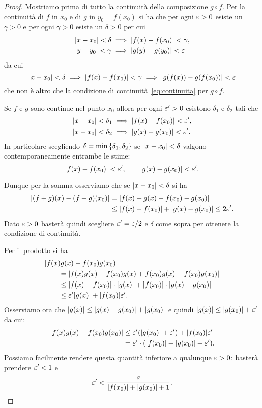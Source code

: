  \begin{proof}
  Mostriamo prima di tutto la continuità
  della composizione $g\circ f$.
  Per la continuità di $f$ in $x_0$ e di $g$ in $y_0=f(x_0)$
  si ha che per ogni $\varepsilon>0$ esiste un $\gamma>0$
  e per ogni $\gamma>0$ esiste un $\delta>0$ per cui
  \begin{align*}
   {\left|x-x_0\right|}< \delta &\implies {\left|f(x)-f(x_0)\right|}<\gamma,\\
   {\left|y-y_0\right|}< \gamma & \implies {\left|g(y)-g(y_0)\right|}<\varepsilon
  \end{align*}
  da cui
  \[
  {\left|x-x_0\right|}< \delta
  \implies {\left|f(x)-f(x_0)\right|}< \gamma
  \implies {\left|g(f(x))-g(f(x_0))\right|} < \varepsilon
  \]
  che non è altro che la condizione di
  continuità~\eqref{eq:continuita} per $g\circ f$.
  
  Se $f$ e $g$ sono continue nel punto $x_0$
  allora per ogni $\varepsilon'>0$ esistono $\delta_1$
  e $\delta_2$ tali che
  \begin{align*}
   {\left|x-x_0\right|} < \delta_1 &\implies {\left|f(x)-f(x_0)\right|} < \varepsilon',
   \\
   {\left|x-x_0\right|} < \delta_2 &\implies {\left|g(x)-g(x_0)\right|} < \varepsilon'.
  \end{align*}
  In particolare scegliendo $\delta = \min{\left\{ \delta_1,\delta_2 \right\}}$
  se ${\left|x-x_0\right|} < \delta$ valgono contemporaneamente
  entrambe le stime:
  \[
   {\left|f(x)-f(x_0)\right|}< \varepsilon', \qquad
   {\left|g(x)-g(x_0)\right|}< \varepsilon'.
  \]
  
  Dunque per la somma osserviamo che se ${\left|x-x_0\right|}<\delta$
  si ha
  \begin{align*}
   {\left|(f+g)(x) - (f+g)(x_0)\right|}
    &= {\left|f(x)+g(x)-f(x_0)-g(x_0)\right|}\\
    &\le {\left|f(x)-f(x_0)\right|} + {\left|g(x)-g(x_0)\right|}
    \le 2 \varepsilon'.
  \end{align*}
  Dato $\varepsilon>0$ basterà quindi scegliere $\varepsilon' = \varepsilon / 2$
  e $\delta$ come sopra per ottenere la condizione di continuità.
  
  Per il prodotto si ha
  \begin{align*}
    \MoveEqLeft \abs{f(x)g(x)-f(x_0)g(x_0)}\\
    &= \abs{f(x)g(x) - f(x_0)g(x) + f(x_0)g(x) - f(x_0)g(x_0)}\\
    &\le \abs{f(x)-f(x_0)}\cdot\abs{g(x)} + \abs{f(x_0)}\cdot \abs{g(x)-g(x_0)} \\
    &\le \eps' \abs{g(x)} + \abs{f(x_0)} \eps'.
  \end{align*}
  Osserviamo ora che ${\left|g(x)\right|}\le {\left|g(x)-g(x_0)\right|} + {\left|g(x_0)\right|}$
  e quindi ${\left|g(x)\right|}\le {\left|g(x_0)\right|}+\varepsilon'$ da cui:
  \begin{align*}
    {\left|f(x)g(x)-f(x_0)g(x_0)\right|}
    &\le \varepsilon' {\left( {\left|g(x_0)\right|}+\varepsilon' \right)} + {\left|f(x_0)\right|} \varepsilon' \\
    &= \varepsilon' \cdot({\left|f(x_0)\right|} + {\left|g(x_0)\right|} + \varepsilon').
  \end{align*}
  Possiamo facilmente rendere questa quantità inferiore a
  qualunque $\varepsilon>0$: basterà prendere $\varepsilon'<1$ e
  \[
    \varepsilon' < \frac{\varepsilon}{{\left|f(x_0)\right|} + {\left|g(x_0)\right|} + 1}.
  \]
  

\end{proof}
